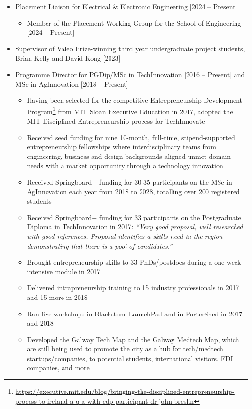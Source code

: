 \documentclass[10pt,a4paper]{res} %
\begin{document}
\begin{resume}
\begin{itemize} \itemsep -2pt
\item Placement Liaison for Electrical \& Electronic Engineering [2024 -- Present]
\begin{itemize} \itemsep -2pt
\item Member of the Placement Working Group for the School of Engineering [2024 -- Present]
\end{itemize}
\item Supervisor of Valeo Prize-winning third year undergraduate project students, Brian Kelly and David Kong [2023]
\item Programme Director for PGDip/MSc in TechInnovation [2016 -- Present] and MSc in AgInnovation [2018 -- Present]
\begin{itemize} \itemsep -2pt
\item Having been selected for the competitive Entrepreneurship Development Program\footnote{\url{https://executive.mit.edu/blog/bringing-the-disciplined-entrepreneurship-process-to-ireland-a-q-a-with-edp-participant-dr-john-breslin}} from MIT Sloan Executive Education in 2017, adopted the MIT Disciplined Entrepreneurship process for TechInnovate
\item Received seed funding for nine 10-month, full-time, stipend-supported entrepreneurship fellowships where interdisciplinary teams from engineering, business and design backgrounds aligned unmet domain needs with a market opportunity through a technology innovation
\item Received Springboard+ funding for 30-35 participants on the MSc in AgInnovation each year from 2018 to 2028, totalling over 200 registered students
\item Received Springboard+ funding for 33 participants on the Postgraduate Diploma in TechInnovation in 2017: \textit{``Very good proposal, well researched with good references. Proposal identifies a skills need in the region demonstrating that there is a pool of candidates.''}
\item Brought entrepreneurship skills to 33 PhDs/postdocs during a one-week intensive module in 2017
\item Delivered intrapreneurship training to 15 industry professionals in 2017 and 15 more in 2018
\item Ran five workshops in Blackstone LaunchPad and in PorterShed in 2017 and 2018
\item Developed the Galway Tech Map and the Galway Medtech Map, which are still being used to promote the city as a hub for tech/medtech startups/companies, to potential students, international visitors, FDI companies, and more

\end{itemize}
\end{itemize}
\end{resume}
\end{document}
